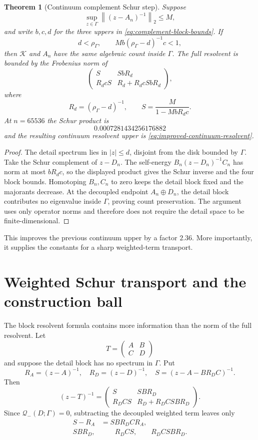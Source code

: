 \documentclass[11pt]{article}
\newtheorem{theorem}{Theorem}[section]
\theoremstyle{definition}
\theoremstyle{remark}
\newcommand{\R}{\mathbb R}
\newcommand{\C}{\mathbb C}
\newcommand{\cK}{\mathcal K}
\newcommand{\cQ}{\mathcal Q}
\newcommand{\norm}[1]{\left\lVert #1\right\rVert}
\begin{document}
\begin{theorem}[Continuum complement Schur step]
\label{thm:complement-schur}
Suppose
\[
 \sup_{z\in\Gamma}\norm{(z-A_n)^{-1}}_2\le M,
\]
and write $b,c,d$ for the three uppers in
\eqref{eq:complement-block-bounds}.  If
\[
 d<\rho_\Gamma,
 \qquad
 M b(\rho_\Gamma-d)^{-1}c<1,
\]
then $\cK$ and $A_n$ have the same algebraic count inside $\Gamma$.
The full resolvent is bounded by the Frobenius norm of
\[
 \begin{pmatrix}
 S&SbR_d\\R_dcS&R_d+R_dcSbR_d
 \end{pmatrix},
\]
where
\[
 R_d=(\rho_\Gamma-d)^{-1},
 \qquad
 S=\frac{M}{1-MbR_dc}.
\]
At $n=65536$ the Schur product is
\[
 0.0007281434256176882
\]
and the resulting continuum resolvent upper is
\eqref{eq:improved-continuum-resolvent}.
\end{theorem}

\begin{proof}
The detail spectrum lies in $|z|\le d$, disjoint from the disk bounded by
$\Gamma$.  Take the Schur complement of $z-D_n$.  The self-energy
$B_n(z-D_n)^{-1}C_n$ has norm at most $bR_dc$, so the displayed product
gives the Schur inverse and the four block bounds.  Homotoping
$B_n,C_n$ to zero keeps the detail block fixed and the majorants decrease.
At the decoupled endpoint $A_n\oplus D_n$, the detail block contributes no
eigenvalue inside $\Gamma$, proving count preservation.  The argument uses
only operator norms and therefore does not require the detail space to be
finite-dimensional.
\end{proof}

This improves the previous continuum upper by a factor $2.36$.  More
importantly, it supplies the constants for a sharp weighted-term transport.

\section{Weighted Schur transport and the construction ball}
\label{sec:weighted-schur}

The block resolvent formula contains more information than the norm of the
full resolvent.  Let
\[
 T=\begin{pmatrix}A&B\\C&D\end{pmatrix}
\]
and suppose the detail block has no spectrum in $\Gamma$.  Put
\[
 R_A=(z-A)^{-1},
 \quad R_D=(z-D)^{-1},
 \quad S=(z-A-BR_DC)^{-1}.
\]
Then
\[
 (z-T)^{-1}=
 \begin{pmatrix}
 S&SBR_D\\R_DCS&R_D+R_DCSBR_D
 \end{pmatrix}.
\]
Since $\cQ_-(D;\Gamma)=0$, subtracting the decoupled weighted term leaves
only
\begin{align*}
 S-R_A&=SBR_DCR_A,\\
 SBR_D,&\qquad R_DCS,\qquad R_DCSBR_D.
\end{align*}
\end{document}
